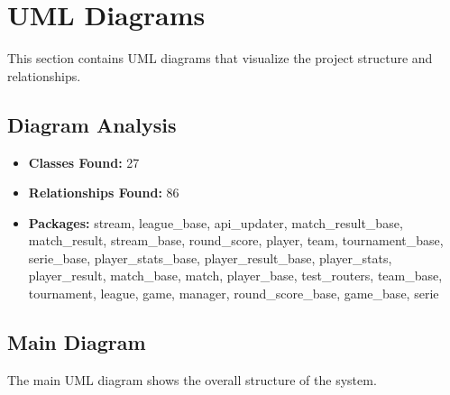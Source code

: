 \documentclass[11pt,a4paper]{article}
\begin{document}
\vspace{1em}

\section{UML Diagrams}

This section contains UML diagrams that visualize the project structure and relationships.

\subsection{Diagram Analysis}

\begin{itemize}
    \item \textbf{Classes Found:} 27
    \item \textbf{Relationships Found:} 86
    \item \textbf{Packages:} stream, league\_base, api\_updater, match\_result\_base, match\_result, stream\_base, round\_score, player, team, tournament\_base, serie\_base, player\_stats\_base, player\_result\_base, player\_stats, player\_result, match\_base, match, player\_base, test\_routers, team\_base, tournament, league, game, manager, round\_score\_base, game\_base, serie
\end{itemize}

\subsection{Main Diagram}

The main UML diagram shows the overall structure of the system.
\end{document}
